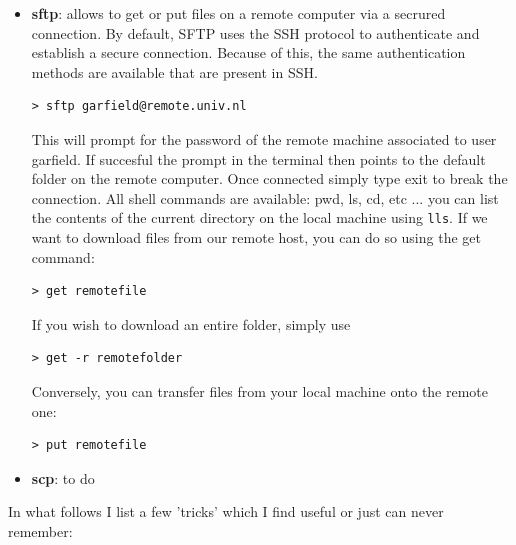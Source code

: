 \begin{itemize}
\item {\color{teal} \bf sftp}: allows to get or put files on a remote computer via a secrured connection. By default, SFTP uses the SSH protocol to authenticate and establish a secure connection. Because of this, the same authentication methods are available that are present in SSH.
\begin{mdframed}[backgroundcolor=gray!10]
\begin{verbatim}
> sftp garfield@remote.univ.nl 
\end{verbatim}
\end{mdframed}
This will prompt for the password of the remote machine associated to user garfield.
If succesful the prompt in the terminal then points to the default folder on the remote computer.
Once connected simply type exit to break the connection. 
All shell commands are available: pwd, ls, cd, etc ...
you can list the contents of the current directory on the local machine using {\tt lls}.
If we want to download files from our remote host, you can do so using the get command:
\begin{mdframed}[backgroundcolor=gray!10]
\begin{verbatim}
> get remotefile 
\end{verbatim}
\end{mdframed}
If you wish to download an entire folder, simply use 
\begin{mdframed}[backgroundcolor=gray!10]
\begin{verbatim}
> get -r remotefolder 
\end{verbatim}
\end{mdframed}
Conversely, you can transfer files from your local machine onto the remote one:
\begin{mdframed}[backgroundcolor=gray!10]
\begin{verbatim}
> put remotefile 
\end{verbatim}
\end{mdframed}


 



\item {\color{teal} \bf scp}:   to do 



\end{itemize} 


\vspace{1cm}

In what follows I list a few 'tricks' which I find useful or just can never remember:

